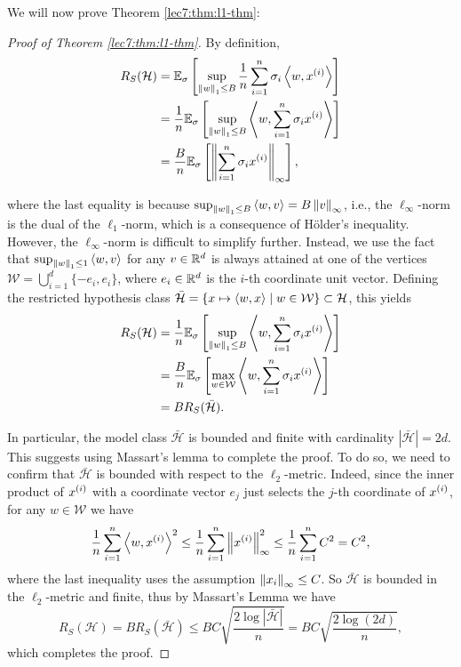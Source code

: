 We will now prove Theorem \ref{lec7:thm:l1-thm}:

\begin{proof}[Proof of Theorem \ref{lec7:thm:l1-thm}]
    By definition,
    \begin{align}
        R_S(\mathcal{H}) &= \E_\sigma\sbr{ \sup_{\Norm{w}_1 \le B} \frac{1}{n} \sum_{i=1}^n\sigma_i \inprod{w,x\sp{i}} } \\
        &= \frac{1}{n} \E_\sigma\sbr{ \sup_{\Norm{w}_1\le B} \inprod{w,\sum_{i=1}^n\sigma_i x\sp{i}} } \\
        &= \frac{B}{n} \E_\sigma\sbr{ \Norm{\sum_{i=1}^n \sigma_i  x\sp{i}}_\infty  },
    \end{align}
    
    where the last equality is because $\sup_{\Norm{w}_1 \leq B}\inprod{w,v} = B\Norm{v}_\infty$, i.e., the $\ell_\infty$-norm is the dual of the $\ell_1$-norm, which is a consequence of H\"older's inequality. However, the $\ell_\infty$-norm is difficult to simplify further. Instead, we use the fact that $\sup_{\Norm{w}_1 \leq 1} \inprod{w,v}$ for any $v \in \R^d$ is always attained at one of the vertices $\mathcal{W} = \bigcup_{i=1}^d \{-e_i,e_i\}$, where $e_i \in \R^d$ is the $i$-th coordinate unit vector. Defining the restricted hypothesis class $\bar{\mathcal{H}} = \{x \mapsto \inprod{w,x} \mid w \in \mathcal{W}\} \subset \mathcal{H}$, this yields
    \begin{align}
        R_S(\mathcal{H}) &= \frac{1}{n} \E_\sigma\sbr{ \sup_{\Norm{w}_1 \le B} \inprod{w,\sum_{i=1}^n\sigma_i x\sp{i}} } \\
        &= \frac{B}{n} \E_\sigma\sbr{ \max_{w\in\mathcal{W}} \inprod{w,\sum_{i=1}^n\sigma_i x\sp{i}} } \\
        &= BR_S(\bar{\mathcal{H}}).
    \end{align}
    
    In particular, the model class $\bar{\mathcal{H}}$ is bounded and finite with cardinality $|\bar{\mathcal{H}}| = 2d$. This suggests using Massart's lemma to complete the proof. To do so, we need to confirm that $\mathcal{\bar{H}}$ is bounded with respect to the $\ell_2$-metric. Indeed, since the inner product of $x\sp{i}$ with a coordinate vector $e_j$ just selects the $j$-th coordinate of $x\sp{i}$, for any $w \in \mathcal{W}$ we have
    \begin{equation}
        \frac{1}{n}\sum_{i=1}^n \inprod{w,x\sp{i}}^2 \leq \frac{1}{n}\sum_{i=1}^n \Norm{x\sp{i}}^2_\infty \leq \frac{1}{n}\sum_{i=1}^n C^2 = C^2,
    \end{equation}
    where the last inequality uses the assumption $\Norm{x_i}_\infty \leq C$. So $\bar{\mathcal{H}}$ is bounded in the $\ell_2$-metric and finite, thus by Massart's Lemma we have
    \begin{equation}
        R_S(\mathcal{H}) = B R_S(\bar{\mathcal{H}}) \leq BC\sqrt{\frac{2\log|\bar{\mathcal{H}}|}{n}} = BC\sqrt{\frac{2\log(2d)}{n}},
    \end{equation}
    which completes the proof.
\end{proof}

